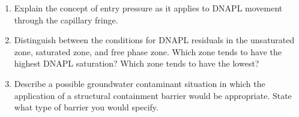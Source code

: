 \documentclass[12pt]{article}
\begin{document}
\begin{enumerate}




\item Explain the concept of entry pressure as it applies to DNAPL movement through the capillary fringe.


\item Distinguish between the conditions for DNAPL residuals in the unsaturated zone, saturated zone, and free phase zone.  Which zone tends to have the highest DNAPL saturation? Which zone tends to have the lowest?

\item Describe a possible groundwater contaminant situation in which the application of a structural containment barrier would be appropriate.  State what type of barrier you would specify.


\end{enumerate}
\end{document}
